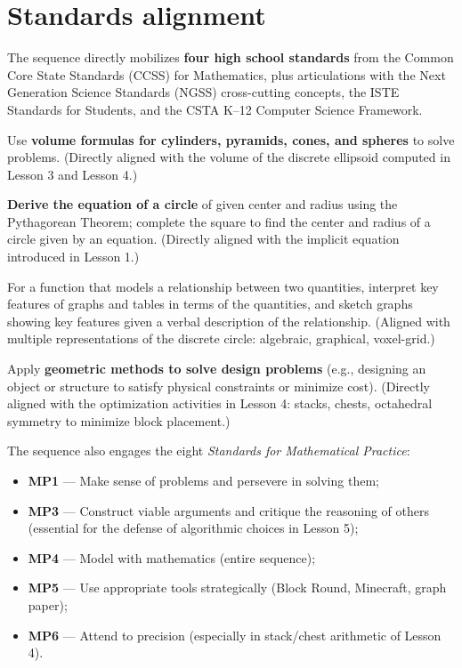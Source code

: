 \documentclass[12pt,a4paper]{scrartcl}
\newcommand{\acc}[1]{\textcolor{accent}{\textbf{#1}}}
\begin{document}
\section{Standards alignment}\label{sec:standards}

The sequence directly mobilizes \acc{four high school standards} from the Common Core State Standards (CCSS) for Mathematics, plus articulations with the Next Generation Science Standards (NGSS) cross-cutting concepts, the ISTE Standards for Students, and the CSTA K--12 Computer Science Framework.

\begin{standard}
Use \acc{volume formulas for cylinders, pyramids, cones, and spheres} to solve problems. (Directly aligned with the volume of the discrete ellipsoid computed in Lesson 3 and Lesson 4.)
\end{standard}

\begin{standard}
\acc{Derive the equation of a circle} of given center and radius using the Pythagorean Theorem; complete the square to find the center and radius of a circle given by an equation. (Directly aligned with the implicit equation introduced in Lesson 1.)
\end{standard}

\begin{standard}
For a function that models a relationship between two quantities, interpret key features of graphs and tables in terms of the quantities, and sketch graphs showing key features given a verbal description of the relationship. (Aligned with multiple representations of the discrete circle: algebraic, graphical, voxel-grid.)
\end{standard}

\begin{standard}
Apply \acc{geometric methods to solve design problems} (e.g., designing an object or structure to satisfy physical constraints or minimize cost). (Directly aligned with the optimization activities in Lesson 4: stacks, chests, octahedral symmetry to minimize block placement.)
\end{standard}

\medskip
The sequence also engages the eight \emph{Standards for Mathematical Practice}:

\begin{itemize}[leftmargin=1.3em,itemsep=0.15em,topsep=0.3em]
  \item \acc{MP1} --- Make sense of problems and persevere in solving them;
  \item \acc{MP3} --- Construct viable arguments and critique the reasoning of others (essential for the defense of algorithmic choices in Lesson 5);
  \item \acc{MP4} --- Model with mathematics (entire sequence);
  \item \acc{MP5} --- Use appropriate tools strategically (Block Round, Minecraft, graph paper);
  \item \acc{MP6} --- Attend to precision (especially in stack/chest arithmetic of Lesson 4).
\end{itemize}
\end{document}
